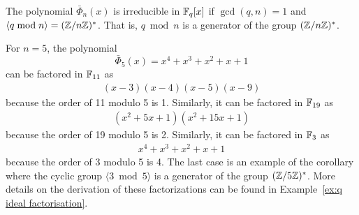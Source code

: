 \documentclass[../main.tex]{subfiles}
\begin{document}
\begin{corollary}
The polynomial $\bar{\Phi}_n(x)$ is irreducible in $\mathbb{F}_q[x]$ if $\gcd(q,n)=1$ and $\langle q \bmod n \rangle = (\mathbb{Z} / n\mathbb{Z})^*$. That is, $q \bmod n$ is a generator of the group $(\mathbb{Z} / n\mathbb{Z})^*$. 
\end{corollary}

\begin{example}
For $n=5$, the polynomial 
\begin{equation*}
    \bar{\Phi}_5(x) = x^4+x^3+x^2+x+1
\end{equation*}
can be factored in $\mathbb{F}_{11}$ as 
\begin{align*}
    (x-3)(x-4)(x-5)(x-9)
\end{align*}
because the order of 11 modulo 5 is 1. Similarly, it can be factored in $\mathbb{F}_{19}$ as 
\begin{align*}
    (x^2+5x+1)(x^2+15x+1) 
\end{align*}
because the order of 19 modulo 5 is 2. Similarly, it can be factored in $\mathbb{F}_3$ as 
\begin{align*}
    x^4+x^3+x^2+x+1
\end{align*}
because the order of 3 modulo 5 is 4. The last case is an example of the corollary where the cyclic group $\langle3 \bmod 5\rangle$ is a generator of the group $(\mathbb{Z} / 5\mathbb{Z})^*$.
More details on the derivation of these factorizations can be found in Example~\ref{ex:q ideal factorisation}.
\end{example}









%
%
\end{document}
